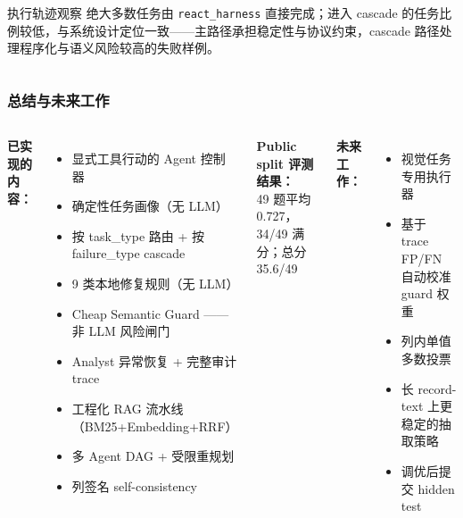 \documentclass[11pt, aspectratio=169]{beamer}
\begin{document}
\begin{frame}[t]
\begin{columns}[T]
\vspace{0.4em}
\begin{block}{执行轨迹观察}
\scriptsize
绝大多数任务由 \texttt{react\_harness} 直接完成；进入 cascade 的任务比例较低，与系统设计定位一致——主路径承担稳定性与协议约束，cascade 路径处理程序化与语义风险较高的失败样例。
\end{block}

\end{columns}
\end{frame}

\begin{frame}
\frametitle{总结与未来工作}

\begin{columns}[T]
\textbf{已实现的内容：}
\begin{itemize}
    \item 显式工具行动的 Agent 控制器
    \item 确定性任务画像（无 LLM）
    \item 按 task\_type 路由 + 按 failure\_type cascade
    \item 9 类本地修复规则（无 LLM）
    \item \alert{Cheap Semantic Guard} —— 非 LLM 风险闸门
    \item Analyst 异常恢复 + 完整审计 trace
    \item 工程化 RAG 流水线（BM25+Embedding+RRF）
    \item 多 Agent DAG + 受限重规划
    \item 列签名 self-consistency
\end{itemize}

\textbf{Public split 评测结果：}\\
49 题平均 0.727，34/49 满分；总分 35.6/49

\vspace{0.4em}
\textbf{未来工作：}
\begin{itemize}
    \item 视觉任务专用执行器
    \item 基于 trace FP/FN 自动校准 guard 权重
    \item 列内单值多数投票
    \item 长 record-text 上更稳定的抽取策略
    \item 调优后提交 hidden test
\end{itemize}
\end{columns}

\end{frame}
\end{document}
